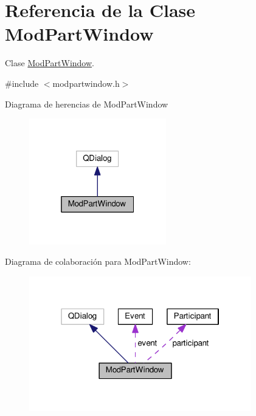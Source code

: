 \hypertarget{class_mod_part_window}{}\section{Referencia de la Clase Mod\+Part\+Window}
\label{class_mod_part_window}


Clase \hyperlink{class_mod_part_window}{Mod\+Part\+Window}.  




{\ttfamily \#include $<$modpartwindow.\+h$>$}



Diagrama de herencias de Mod\+Part\+Window\nopagebreak
\begin{figure}[H]
\begin{center}
\leavevmode
\includegraphics[width=169pt]{class_mod_part_window__inherit__graph}
\end{center}
\end{figure}


Diagrama de colaboración para Mod\+Part\+Window\+:\nopagebreak
\begin{figure}[H]
\begin{center}
\leavevmode
\includegraphics[width=274pt]{class_mod_part_window__coll__graph}
\end{center}
\end{figure}
